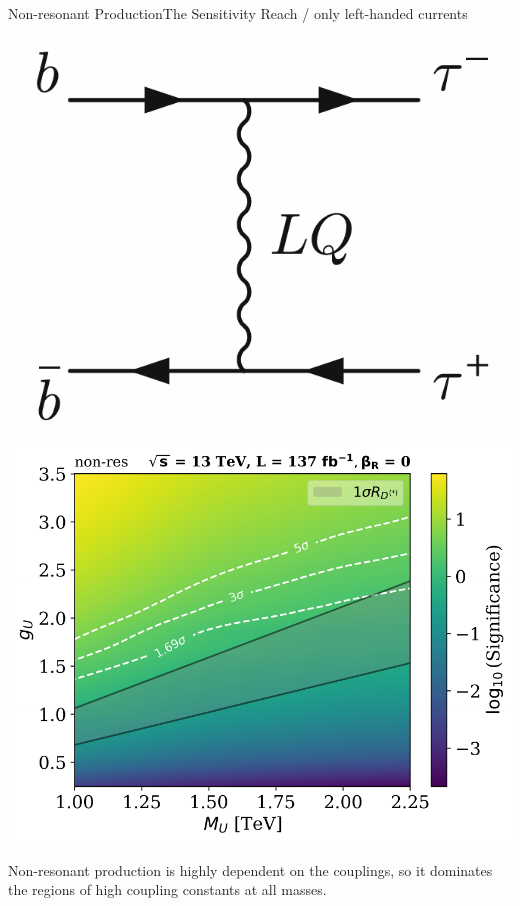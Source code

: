 \documentclass{bredelebeamer}
\begin{document}
\begin{frame}{Non-resonant Production}{The Sensitivity Reach / only left-handed currents}
	\begin{minipage}{.30\linewidth}
		\includegraphics[width=\linewidth]{non_resonant.png}
	\end{minipage}
	\begin{minipage}{.68\linewidth}
		\includegraphics[width=\linewidth]{Significance_Heatmap_13TeV_L137_non-res_combined_woRHC.pdf}
	\end{minipage}

	{\large
		  Non-resonant production is highly dependent on the couplings, so it dominates the regions of high coupling constants at all masses.
	}
\end{frame}
\end{document}

